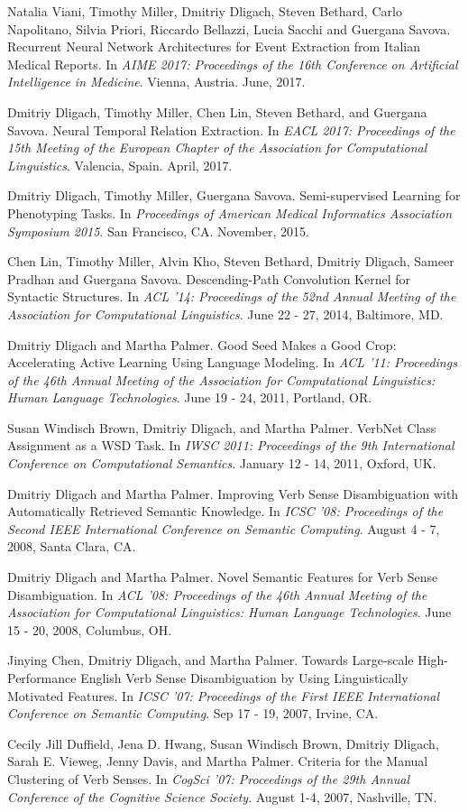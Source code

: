 \documentclass[letterpaper]{article}
\renewenvironment{itemize}{
  \begin{list}{}{
    \setlength{\leftmargin}{1.5em}
  }
}{
  \end{list}
}
\begin{document}
\begin{itemize}
\item Natalia Viani, Timothy Miller, Dmitriy Dligach, Steven Bethard, Carlo Napolitano, Silvia Priori, Riccardo Bellazzi, Lucia Sacchi and Guergana Savova. Recurrent Neural Network Architectures for Event Extraction from Italian Medical Reports. In \emph{AIME 2017: Proceedings of the 16th Conference on Artificial Intelligence in Medicine}. Vienna, Austria. June, 2017.
\item Dmitriy Dligach, Timothy Miller, Chen Lin, Steven Bethard, and Guergana Savova. Neural Temporal Relation Extraction. In \emph{EACL 2017: Proceedings of the 15th Meeting of the European Chapter of the Association
for Computational Linguistics}. Valencia, Spain. April, 2017.
\item Dmitriy Dligach, Timothy Miller, Guergana Savova. Semi-supervised Learning for Phenotyping Tasks. In \emph{Proceedings of American Medical Informatics Association Symposium 2015}. San Francisco, CA. November, 2015.
\item Chen Lin, Timothy Miller, Alvin Kho, Steven Bethard, Dmitriy Dligach, Sameer Pradhan and Guergana Savova. Descending-Path Convolution Kernel for Syntactic Structures. In \emph {ACL '14: Proceedings of the 52nd Annual Meeting of the Association for Computational Linguistics}. June 22 - 27, 2014, Baltimore, MD.
\item Dmitriy Dligach and Martha Palmer. Good Seed Makes a Good Crop: Accelerating Active Learning Using Language Modeling. In \emph {ACL '11: Proceedings of the 46th Annual Meeting of the Association for Computational Linguistics: Human Language Technologies}. June 19 - 24, 2011, Portland, OR.
\item Susan Windisch Brown, Dmitriy Dligach, and Martha Palmer. VerbNet Class Assignment as a WSD Task. In \emph {IWSC 2011: Proceedings of the 9th International Conference on Computational Semantics}. January 12 - 14, 2011, Oxford, UK.
\item Dmitriy Dligach and Martha Palmer. Improving Verb Sense Disambiguation with Automatically Retrieved Semantic Knowledge. In \emph {ICSC '08: Proceedings of the Second IEEE International Conference on Semantic Computing}. August 4 - 7, 2008, Santa Clara, CA.
\item Dmitriy Dligach and Martha Palmer. Novel Semantic Features for Verb Sense Disambiguation. In \emph {ACL '08: Proceedings of the 46th Annual Meeting of the Association for Computational Linguistics: Human Language Technologies}. June 15 - 20, 2008, Columbus, OH.
\item Jinying Chen, Dmitriy Dligach, and Martha Palmer. Towards Large-scale High-Performance English Verb Sense Disambiguation by Using Linguistically Motivated Features. In \emph {ICSC '07: Proceedings of the First IEEE International Conference on Semantic Computing}. Sep 17 - 19, 2007, Irvine, CA.
\item Cecily Jill Duffield, Jena D. Hwang, Susan Windisch Brown, Dmitriy Dligach, Sarah E. Vieweg, Jenny Davis, and Martha Palmer. Criteria for the Manual Clustering of Verb Senses. In \emph {CogSci '07: Proceedings of the 29th Annual Conference of the Cognitive Science Society}. August 1-4, 2007, Nashville, TN.
\end{itemize}
\end{document}
